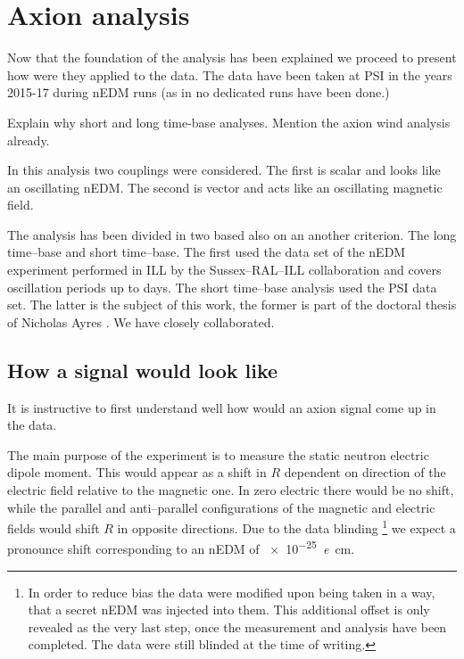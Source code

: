 \chapter{Axion analysis}
\label{ch:axion-analysis}

Now that the foundation of the analysis has been explained we proceed to present how were they applied to the data. The data have been taken at PSI in the years 2015-17 during nEDM runs (as in no dedicated runs have been done.)

Explain why short and long time-base analyses. Mention the axion wind analysis already.

In this analysis two couplings were considered. The first is scalar and looks like an oscillating nEDM. The second is vector and acts like an oscillating magnetic field.

The analysis has been divided in two based also on an another criterion. The long time--base and short time--base. The first used the data set of the nEDM experiment performed in ILL by the Sussex--RAL--ILL collaboration and covers oscillation periods up to days. The short time--base analysis used the PSI data set. The latter is the subject of this work, the former is part of the doctoral thesis of Nicholas Ayres . We have closely collaborated.



\section{How a signal would look like}
It is instructive to first understand well how would an axion signal come up in the data.

The main purpose of the experiment is to measure the static neutron electric dipole moment. This would appear as a shift in $R$ dependent on direction of the electric field relative to the magnetic one. In zero electric there would be no shift, while the parallel and anti--parallel configurations of the magnetic and electric fields would shift $R$ in opposite directions. Due to the data blinding
\footnote{In order to reduce bias the data were modified upon being taken in a way, that a secret nEDM was injected into them. This additional offset is only revealed as the very last step, once the measurement and analysis have been completed. The data were still blinded at the time of writing.}
we expect a pronounce shift corresponding to an nEDM of \SI{e-25}{\elementarycharge\centi\meter}.

